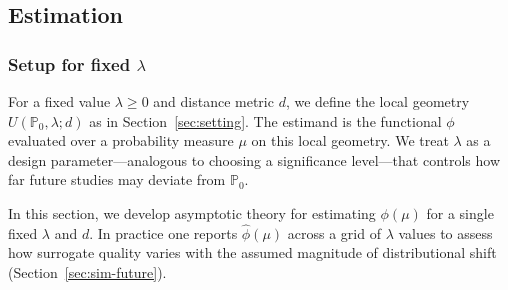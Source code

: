 \documentclass{article}
\newtheorem{remark}{Remark}
\newcommand{\PP}{\mathbb{P}}
\begin{document}
%
%

\subsection{Estimation}\label{sec:estimation}

\subsubsection{Setup for fixed $\lambda$}

For a fixed value $\lambda \geq 0$ and distance metric $d$, we define the local geometry
$U(\PP_0, \lambda; d)$ as in Section~\ref{sec:setting}. The estimand is the functional
$\phi$ evaluated over a probability measure $\mu$ on this local geometry. We treat $\lambda$
as a design parameter—analogous to choosing a significance level—that
controls how far future studies may deviate from $\PP_0$.

In this section, we develop asymptotic theory for estimating $\phi(\mu)$
for a single fixed $\lambda$ and $d$. In practice one reports
$\hat{\phi}(\mu)$ across a grid of $\lambda$ values to assess how surrogate
quality varies with the assumed magnitude of distributional shift
(Section~\ref{sec:sim-future}).
\end{document}
